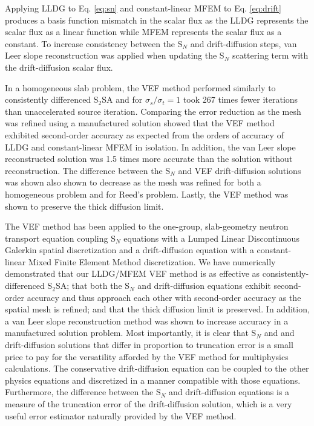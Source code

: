 \documentclass{ictt25}
\newcommand{\SN}{S$_N$\xspace}
\begin{document}
Applying LLDG to Eq. \ref{eq:sn} and constant-linear MFEM to Eq. \ref{eq:drift} produces a basis function mismatch in the scalar flux as the LLDG represents the scalar flux as a linear function while MFEM represents the scalar flux as a constant. To increase consistency between the \SN and drift-diffusion steps, van Leer slope reconstruction was applied when updating the \SN scattering term with the drift-diffusion scalar flux. 

In a homogeneous slab problem, the VEF method performed similarly to consistently differenced S$_2$SA and for $\sigma_s/\sigma_t = 1$ took 267 times fewer iterations than unaccelerated source iteration. 
Comparing the error reduction as the mesh was refined using a manufactured solution showed that the VEF method exhibited second-order accuracy as expected from the orders of accuracy of LLDG and constant-linear MFEM in isolation. In addition, the van Leer slope reconstructed solution was 1.5 times more accurate than the solution without reconstruction. The difference between the \SN and VEF drift-diffusion solutions was shown also shown to decrease as the mesh was refined for both a homogeneous problem and for Reed's problem. Lastly, the VEF method was shown to preserve the thick diffusion limit. 

The VEF method has been applied to the one-group, slab-geometry neutron transport equation coupling \SN equations with a Lumped Linear Discontinuous Galerkin spatial discretization and a drift-diffusion equation with a constant-linear Mixed Finite Element Method discretization. We have numerically demonstrated that our LLDG/MFEM VEF method is as effective as consistently-differenced S$_2$SA; that both the \SN and drift-diffusion equations exhibit second-order accuracy and thus approach each other with second-order accuracy as the spatial mesh is refined; and that the thick diffusion limit is preserved. In addition, a van Leer slope reconstruction method was shown to increase accuracy in a manufactured solution problem. Most importantly, it is clear that \SN and and drift-diffusion solutions that differ in proportion to truncation error is a small price to pay for the versatility afforded by the VEF method for multiphysics calculations. The conservative drift-diffusion equation can be coupled to the other physics equations and discretized in a manner compatible with those equations.  Furthermore, the difference between the \SN and drift-diffusion equations is a measure of the truncation error of the drift-diffusion solution, which is a very useful error estimator naturally provided by the VEF method.  

\setlength{\baselineskip}{12pt}


\end{document}
